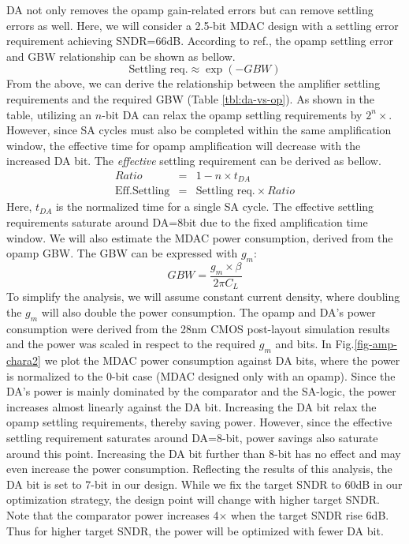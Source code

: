 DA not only removes the opamp gain-related errors but can remove settling errors as well. Here, we will consider a 2.5-bit MDAC design with a settling error requirement achieving SNDR=66dB.   
According to ref.\cite{demerow1970settling}, the opamp settling error and GBW relationship can be shown as bellow. 
\begin{equation}
 \text{Settling req.} \approx \exp(-GBW)
\end{equation}
From the above, we can derive the relationship between the amplifier settling requirements and the required GBW (Table \ref{tbl:da-vs-op}). As shown in the table, utilizing an $n$-bit DA can relax the opamp settling requirements by $2^n \times$. However, since SA cycles must also be completed within the same amplification window, the effective time for opamp amplification will decrease with the increased DA bit. The \textit{effective} settling requirement can be derived as bellow.
\begin{eqnarray}
    Ratio &=& 1 - n \times t_{DA} \\
    \text{Eff.Settling} &=& \text{Settling req.} \times Ratio
\end{eqnarray}
Here, $t_{DA}$ is the normalized time for a single SA cycle. The effective settling requirements saturate around DA=8bit due to the fixed amplification time window. We will also estimate the MDAC power consumption, derived from the opamp GBW. The GBW can be expressed with $g_m$:
\begin{equation}
    GBW = \frac{g_m \times \beta}{2 \pi C_L}
\end{equation}
To simplify the analysis, we will assume constant current density, where doubling the $g_m$ will also double the power consumption. The opamp and DA's power consumption were derived from the 28nm CMOS post-layout simulation results and the power was scaled in respect to the required $g_m$ and bits. In Fig.\ref{fig-amp-chara2} we plot the MDAC power consumption against DA bits, where the power is normalized to the 0-bit case (MDAC designed only with an opamp). Since the DA's power is mainly dominated by the comparator and the SA-logic, the power increases almost linearly against the DA bit.
Increasing the DA bit relax the opamp settling requirements, thereby saving power.  However, since the effective settling requirement saturates around DA=8-bit, power savings also saturate around this point. Increasing the DA bit further than 8-bit has no effect and may even increase the power consumption.
Reflecting the results of this analysis, the DA bit is set to 7-bit in our design. While we fix the target SNDR to 60dB in our optimization strategy, the design point will change with higher target SNDR. Note that the comparator power increases 4$\times$ when the target SNDR rise 6dB. Thus for higher target SNDR, the power will be optimized with fewer DA bit.


